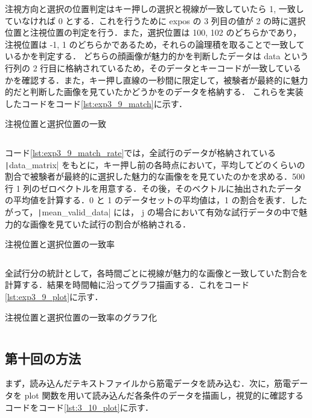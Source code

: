 \documentclass[dvipdfmx, titlepage, t]{jsarticle}
\begin{document}
    注視方向と選択の位置判定はキー押しの選択と視線が一致していたら 1, 一致していなければ 0 とする．これを行うために expos の 3 列目の値が 2 の時に選択位置と注視位置の判定を行う．また，選択位置は 100, 102 のどちらかであり，注視位置は -1, 1 のどちらかであるため，それらの論理積を取ることで一致しているかを判定する． どちらの顔画像が魅力的かを判断したデータは data という行列の 2 行目に格納されているため，そのデータとキーコードが一致しているかを確認する．また，キー押し直線の一秒間に限定して，被験者が最終的に魅力的だと判断した画像を見ていたかどうかをのデータを格納する．
    これらを実装したコードをコード\ref{lst:exp3_9_match}に示す．
    \begin{program}[H]
        \caption{注視位置と選択位置の一致}
        \inputminted[linenos,
        firstline=60,
        lastline=76,
        frame=lines,
        fontsize = \small]{matlab}{code/Exp3_9_Matlab.m}
        \label{lst:exp3_9_match}
    \end{program}
    コード\ref{lst:exp3_9_match_rate}では，全試行のデータが格納されている \texttt|data_matrix| をもとに，キー押し前の各時点において，平均してどのくらいの割合で被験者が最終的に選択した魅力的な画像をを見ていたのかを求める．500 行 1 列のゼロベクトルを用意する．その後，そのベクトルに抽出されたデータの平均値を計算する．0 と 1 のデータセットの平均値は，1 の割合を表す．したがって，\texttt|mean_valid_data| には， j の場合において有効な試行データの中で魅力的な画像を見ていた試行の割合が格納される．
    \begin{program}
        \caption{注視位置と選択位置の一致率}
        \inputminted[linenos,
        firstline=79,
        lastline=91,
        frame=lines,
        fontsize = \small]{matlab}{code/Exp3_9_Matlab.m}
        \label{lst:exp3_9_match_rate}
    \end{program}

    全試行分の統計として，各時間ごとに視線が魅力的な画像と一致していた割合を計算する．結果を時間軸に沿ってグラフ描画する．これをコード\ref{lst:exp3_9_plot}に示す．
    \begin{program}[H]
        \caption{注視位置と選択位置の一致率のグラフ化}
        \inputminted[linenos,
        firstline=92,
        lastline=96,
        frame=lines,
        fontsize = \small]{matlab}{code/Exp3_9_Matlab.m}
        \label{lst:exp3_9_plot}
    \end{program}

    \subsection{第十回の方法}
    まず，読み込んだテキストファイルから筋電データを読み込む．次に，筋電データを plot 関数を用いて読み込んだ各条件のデータを描画し，視覚的に確認するコードをコード\ref{lst:3_10_plot}に示す．
\end{document}
